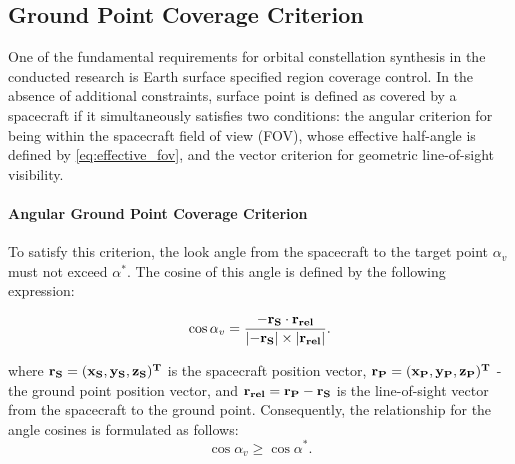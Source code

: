 \subsection{Ground Point Coverage Criterion}
\label{subsec:point_coverage}

One of the fundamental requirements for orbital constellation synthesis in the conducted research is Earth surface specified 
region coverage control. In the absence of additional constraints, surface point is defined as covered by a spacecraft if it simultaneously 
satisfies two conditions: the angular criterion for being within the spacecraft field of view (FOV), whose effective half-angle is defined by
\eqref{eq:effective_fov}, and the vector criterion for geometric line-of-sight visibility.

\paragraph{Angular Ground Point Coverage Criterion}
To satisfy this criterion, the look angle from the spacecraft to the target point $\alpha_v$ must not exceed $\alpha^*$.
The cosine of this angle is defined by the following expression:

\begin{equation}\label{eq:point_look_angle}
    \cos{\alpha_{v}}=\frac{-\bf{r_S}\cdot\bf{r_{rel}}}{\left|-\bf{r_S}\right|\times\left|\bf{r_{rel}}\right|}.
\end{equation}

where $\bf{r_S} = (x_S, y_S, z_S)^T$ is the spacecraft position vector, $\bf{r_P} = (x_P, y_P, z_P)^T$ - the ground point position vector, 
and $\bf{r_{rel}} = \bf{r_P} - \bf{r_S}$ is the line-of-sight vector from the spacecraft to the ground point.
Consequently, the relationship for the angle cosines is formulated as follows:
\begin{equation}\label{eq:angular_coverage_criterion}
    \cos{\alpha_v} \geq \cos{\alpha^*}.
\end{equation}

